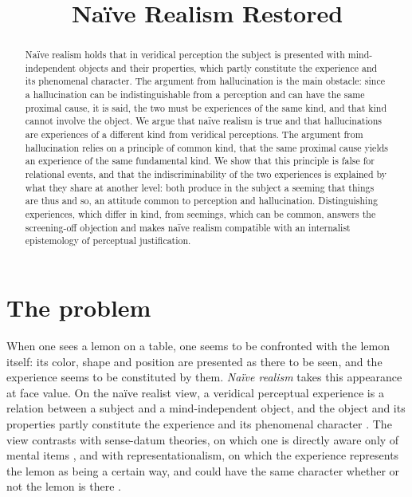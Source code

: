 \documentclass{situationist-preprint}
\title{Naïve Realism Restored}
\begin{document}
\maketitle

\begin{abstract}
Naïve realism holds that in veridical perception the subject is presented with mind-independent objects and their properties, which partly constitute the experience and its phenomenal character. The argument from hallucination is the main obstacle: since a hallucination can be indistinguishable from a perception and can have the same proximal cause, it is said, the two must be experiences of the same kind, and that kind cannot involve the object. We argue that naïve realism is true and that hallucinations are experiences of a different kind from veridical perceptions. The argument from hallucination relies on a principle of common kind, that the same proximal cause yields an experience of the same fundamental kind. We show that this principle is false for relational events, and that the indiscriminability of the two experiences is explained by what they share at another level: both produce in the subject a seeming that things are thus and so, an attitude common to perception and hallucination. Distinguishing experiences, which differ in kind, from seemings, which can be common, answers the screening-off objection and makes naïve realism compatible with an internalist epistemology of perceptual justification.
\end{abstract}

\section{The problem}

When one sees a lemon on a table, one seems to be confronted with the lemon itself: its color, shape and position are presented as there to be seen, and the experience seems to be constituted by them. \emph{Naïve realism} takes this appearance at face value. On the naïve realist view, a veridical perceptual experience is a relation between a subject and a mind-independent object, and the object and its properties partly constitute the experience and its phenomenal character \citep{Martin2002,Campbell2002,Brewer2011}. The view contrasts with sense-datum theories, on which one is directly aware only of mental items \citep{Russell1912,Ayer1940,Robinson1994}, and with representationalism, on which the experience represents the lemon as being a certain way, and could have the same character whether or not the lemon is there \citep{Tye1995,Siegel2010}.
\end{document}

